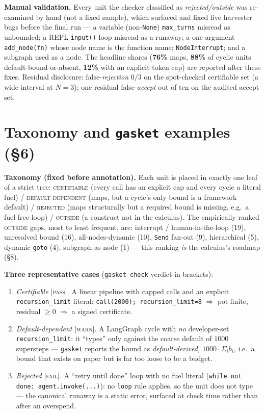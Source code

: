 \documentclass[11pt]{article}
\theoremstyle{plain}
\newcommand{\pot}{\mathrm{pot}}
\begin{document}
\textbf{Manual validation.} Every unit the checker classified as \emph{rejected/outside} was
re-examined by hand (not a fixed sample), which surfaced and fixed five harvester bugs before the
final run --- a variable (non-\texttt{None}) \texttt{max\_turns} misread as unbounded; a REPL
\texttt{input()} loop misread as a runaway; a one-argument \texttt{add\_node(fn)} whose node name is
the function name; \texttt{NodeInterrupt}; and a subgraph used as a node. The headline shares
(\textbf{76\%} maps, \textbf{88\%} of cyclic units default-bound-or-absent, \textbf{12\%} with an
explicit token cap) are reported after these fixes. Residual disclosure: false-\emph{rejection}
$0/3$ on the spot-checked certifiable set (a wide interval at $N=3$); one residual
false-\emph{accept} out of ten on the audited accept set.

\section{Taxonomy and \texttt{gasket} examples (\S6)}

\textbf{Taxonomy (fixed before annotation).} Each unit is placed in exactly one leaf of a strict
tree: \textsc{certifiable} (every call has an explicit cap and every cycle a literal fuel) /
\textsc{default-dependent} (maps, but a cycle's only bound is a framework default) /
\textsc{rejected} (maps structurally but a required bound is missing, e.g.\ a fuel-free loop) /
\textsc{outside} (a construct not in the calculus). The empirically-ranked \textsc{outside} gaps,
most to least frequent, are: interrupt / human-in-the-loop (19), unresolved bound (16),
all-nodes-dynamic (10), \texttt{Send} fan-out (9), hierarchical (5), dynamic \texttt{goto} (4),
subgraph-as-node (1) --- this ranking \emph{is} the calculus's roadmap (\S8).

\textbf{Three representative cases} (\texttt{gasket check} verdict in brackets):
\begin{enumerate}
\item \emph{Certifiable} [\textsc{pass}]. A linear pipeline with capped calls and an explicit
  \texttt{recursion\_limit} literal:
  \texttt{call(2000); recursion\_limit=8} $\Rightarrow$ $\pot$ finite, residual $\ge 0$ $\Rightarrow$
  a signed certificate.
\item \emph{Default-dependent} [\textsc{warn}]. A LangGraph cycle with \emph{no} developer-set
  \texttt{recursion\_limit}: it ``types'' only against the coarse default of $1000$ supersteps ---
  \texttt{gasket} reports the bound as \emph{default-derived, $1000 \cdot \Sigma_i b_i$}, i.e.\ a
  bound that exists on paper but is far too loose to be a budget.
\item \emph{Rejected} [\textsc{fail}]. A ``retry until done'' loop with no fuel literal
  (\texttt{while not done: agent.invoke(...)}): no \texttt{loop} rule applies, so the unit does not
  type --- the canonical runaway is a static error, surfaced at check time rather than after an
  overspend.
\end{enumerate}
\end{document}
